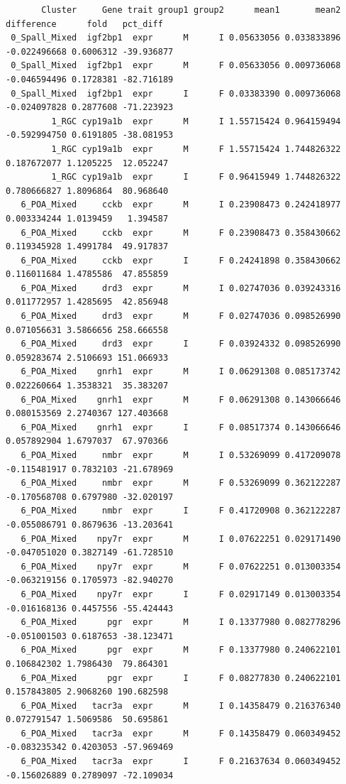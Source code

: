 \documentclass[
  landscape]{article}
\begin{document}
\begin{verbatim}
       Cluster     Gene trait group1 group2      mean1       mean2   difference      fold   pct_diff
 0_Spall_Mixed  igf2bp1  expr      M      I 0.05633056 0.033833896 -0.022496668 0.6006312 -39.936877
 0_Spall_Mixed  igf2bp1  expr      M      F 0.05633056 0.009736068 -0.046594496 0.1728381 -82.716189
 0_Spall_Mixed  igf2bp1  expr      I      F 0.03383390 0.009736068 -0.024097828 0.2877608 -71.223923
         1_RGC cyp19a1b  expr      M      I 1.55715424 0.964159494 -0.592994750 0.6191805 -38.081953
         1_RGC cyp19a1b  expr      M      F 1.55715424 1.744826322  0.187672077 1.1205225  12.052247
         1_RGC cyp19a1b  expr      I      F 0.96415949 1.744826322  0.780666827 1.8096864  80.968640
   6_POA_Mixed     cckb  expr      M      I 0.23908473 0.242418977  0.003334244 1.0139459   1.394587
   6_POA_Mixed     cckb  expr      M      F 0.23908473 0.358430662  0.119345928 1.4991784  49.917837
   6_POA_Mixed     cckb  expr      I      F 0.24241898 0.358430662  0.116011684 1.4785586  47.855859
   6_POA_Mixed     drd3  expr      M      I 0.02747036 0.039243316  0.011772957 1.4285695  42.856948
   6_POA_Mixed     drd3  expr      M      F 0.02747036 0.098526990  0.071056631 3.5866656 258.666558
   6_POA_Mixed     drd3  expr      I      F 0.03924332 0.098526990  0.059283674 2.5106693 151.066933
   6_POA_Mixed    gnrh1  expr      M      I 0.06291308 0.085173742  0.022260664 1.3538321  35.383207
   6_POA_Mixed    gnrh1  expr      M      F 0.06291308 0.143066646  0.080153569 2.2740367 127.403668
   6_POA_Mixed    gnrh1  expr      I      F 0.08517374 0.143066646  0.057892904 1.6797037  67.970366
   6_POA_Mixed     nmbr  expr      M      I 0.53269099 0.417209078 -0.115481917 0.7832103 -21.678969
   6_POA_Mixed     nmbr  expr      M      F 0.53269099 0.362122287 -0.170568708 0.6797980 -32.020197
   6_POA_Mixed     nmbr  expr      I      F 0.41720908 0.362122287 -0.055086791 0.8679636 -13.203641
   6_POA_Mixed    npy7r  expr      M      I 0.07622251 0.029171490 -0.047051020 0.3827149 -61.728510
   6_POA_Mixed    npy7r  expr      M      F 0.07622251 0.013003354 -0.063219156 0.1705973 -82.940270
   6_POA_Mixed    npy7r  expr      I      F 0.02917149 0.013003354 -0.016168136 0.4457556 -55.424443
   6_POA_Mixed      pgr  expr      M      I 0.13377980 0.082778296 -0.051001503 0.6187653 -38.123471
   6_POA_Mixed      pgr  expr      M      F 0.13377980 0.240622101  0.106842302 1.7986430  79.864301
   6_POA_Mixed      pgr  expr      I      F 0.08277830 0.240622101  0.157843805 2.9068260 190.682598
   6_POA_Mixed   tacr3a  expr      M      I 0.14358479 0.216376340  0.072791547 1.5069586  50.695861
   6_POA_Mixed   tacr3a  expr      M      F 0.14358479 0.060349452 -0.083235342 0.4203053 -57.969469
   6_POA_Mixed   tacr3a  expr      I      F 0.21637634 0.060349452 -0.156026889 0.2789097 -72.109034
\end{verbatim}
\end{document}

